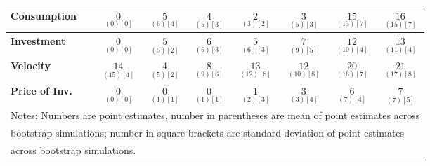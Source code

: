 \documentclass{article}
\begin{document}
\begin{tabular}{|l|c|@{}c|c|@{}c|c|@{}c|c|}
 \textbf{Consumption} & $\underset{(  0) [  0]}{  0}$ & $\underset{(  6) [  4]}{  5}$ & $\underset{(  5) [  3]}{  4}$ & $\underset{(  3) [  2]}{  2}$ & $\underset{(  5) [  3]}{  3}$ & $\underset{( 13) [  7]}{ 15}$ & $\underset{( 15) [  7]}{ 16}$ \\ \hline 
 \textbf{Investment} & $\underset{(  0) [  0]}{  0}$ & $\underset{(  5) [  2]}{  5}$ & $\underset{(  6) [  3]}{  6}$ & $\underset{(  6) [  3]}{  5}$ & $\underset{(  9) [  5]}{  7}$ & $\underset{( 10) [  4]}{ 12}$ & $\underset{( 11) [  4]}{ 13}$ \\ \hline 
 \textbf{Velocity} & $\underset{( 15) [  4]}{ 14}$ & $\underset{(  5) [  2]}{  4}$ & $\underset{(  9) [  6]}{  8}$ & $\underset{( 12) [  8]}{ 13}$ & $\underset{( 10) [  8]}{ 12}$ & $\underset{( 16) [  7]}{ 20}$ & $\underset{( 17) [  8]}{ 21}$ \\ \hline 
 \textbf{Price of Inv.} & $\underset{(  0) [  0]}{  0}$ & $\underset{(  1) [  1]}{  0}$ & $\underset{(  1) [  1]}{  0}$ & $\underset{(  2) [  3]}{  1}$ & $\underset{(  3) [  4]}{  3}$ & $\underset{(  7) [  4]}{  6}$ & $\underset{(  7) [  5]}{  7}$ \\ \hline 
 \multicolumn{8}{|l|}{Notes: Numbers are point estimates, number in 
 parentheses are mean of point estimates across} \\ \hline 
 \multicolumn{8}{|l|}{bootstrap simulations; number in square brackets are 
 standard deviation of point estimates} \\ \hline 
 \multicolumn{8}{|l|}{across bootstrap simulations.} \\ \hline 
 \end{tabular} 
\end{document}
